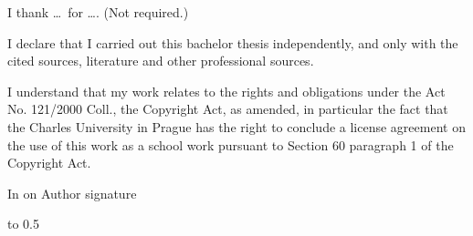 

\newpage
\openright

\noindent
I thank \dots\ for \dots. (Not required.)




\newpage

\noindent
I declare that I carried out this bachelor thesis independently, and only with the cited
sources, literature and other professional sources.

\medskip\noindent
I understand that my work relates to the rights and obligations under the Act No.
121/2000 Coll., the Copyright Act, as amended, in particular the fact that the Charles
University in Prague has the right to conclude a license agreement on the use of this
work as a school work pursuant to Section 60 paragraph 1 of the Copyright Act.

\vspace{18mm}
\noindent
In \makebox[4cm]{\dotfill} on \makebox[2.5cm]{\dotfill}
\hspace*{\fill}
Author signature
\hspace*{\fill}




\newpage

\vbox to 0.5

